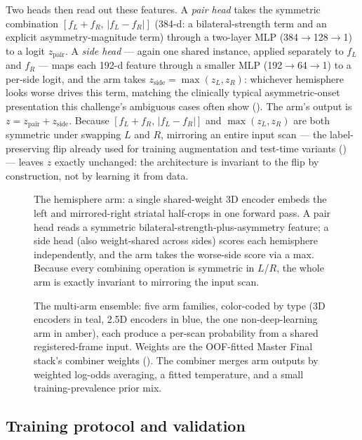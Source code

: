 \documentclass[10pt]{article}
\begin{document}
Two heads then read out these features. A \emph{pair head} takes the symmetric combination $[f_L+f_R,\,|f_L-f_R|]$ (384-d: a bilateral-strength term and an explicit asymmetry-magnitude term) through a two-layer MLP (384$\to$128$\to$1) to a logit $z_{\text{pair}}$. A \emph{side head} --- again one shared instance, applied separately to $f_L$ and $f_R$ --- maps each 192-d feature through a smaller MLP (192$\to$64$\to$1) to a per-side logit, and the arm takes $z_{\text{side}} = \max(z_L, z_R)$: whichever hemisphere looks worse drives this term, matching the clinically typical asymmetric-onset presentation this challenge's ambiguous cases often show (). The arm's output is $z = z_{\text{pair}} + z_{\text{side}}$. Because $[f_L+f_R,\,|f_L-f_R|]$ and $\max(z_L,z_R)$ are both symmetric under swapping $L$ and $R$, mirroring an entire input scan --- the label-preserving flip already used for training augmentation and test-time variants () --- leaves $z$ exactly unchanged: the architecture is invariant to the flip by construction, not by learning it from data.

\begin{figure}[t]
\centering

\caption{The hemisphere arm: a single shared-weight 3D encoder embeds the left and mirrored-right striatal half-crops in one forward pass. A pair head reads a symmetric bilateral-strength-plus-asymmetry feature; a side head (also weight-shared across sides) scores each hemisphere independently, and the arm takes the worse-side score via a max. Because every combining operation is symmetric in $L$/$R$, the whole arm is exactly invariant to mirroring the input scan.}
\label{fig:hemi}
\end{figure}

\begin{figure}[t]
\centering
\resizebox{\textwidth}{!}{}
\caption{The multi-arm ensemble: five arm families, color-coded by type (3D encoders in teal, 2.5D encoders in blue, the one non-deep-learning arm in amber), each produce a per-scan probability from a shared registered-frame input. Weights are the OOF-fitted Master Final stack's combiner weights (). The combiner merges arm outputs by weighted log-odds averaging, a fitted temperature, and a small training-prevalence prior mix.}
\label{fig:ensemble}
\end{figure}

\subsection{Training protocol and validation}
\label{sec:validation}
\end{document}
